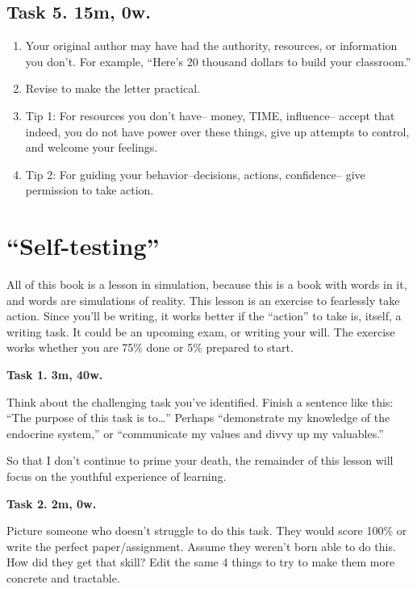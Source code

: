 \documentclass[
]{book}
\providecommand{\tightlist}{%
  \setlength{\itemsep}{0pt}\setlength{\parskip}{0pt}}
\begin{document}
\hypertarget{task-5.-15m-0w.}{%
\section{Task 5. 15m, 0w.}\label{task-5.-15m-0w.}}

\begin{enumerate}
\def\labelenumi{\arabic{enumi}.}
\setcounter{enumi}{66}
\tightlist
\item
  Your original author may have had the authority,
  resources, or information you don't. For example, ``Here's 20 thousand
  dollars to build your classroom.''
\item
  Revise to make the letter practical.
\item
  Tip 1: For resources you don't have-- money, TIME, influence-- accept
  that indeed, you do not have power over these things, give up
  attempts to control, and welcome your feelings.
\item
  Tip 2: For guiding your behavior--decisions, actions, confidence-- give
  permission to take action.
\end{enumerate}

\hypertarget{self-testing}{%
\chapter{``Self-testing''}\label{self-testing}}

All of this book is a lesson in simulation,
because this is a book with words in it,
and words are simulations of reality.
This lesson is an exercise to fearlessly
take action. Since you'll be writing,
it works better if the ``action'' to take is,
itself, a writing task.
It could be an upcoming exam, or writing your will.
The exercise works whether you are
75\% done or 5\% prepared to start.

\textbf{Task 1. 3m, 40w.}

Think about the challenging task you've identified.
Finish a sentence like this:
``The purpose of this task is to\ldots{}''
Perhaps ``demonstrate my knowledge of the endocrine system,'' or
``communicate my values and divvy up my valuables.''

So that I don't continue to prime your death, the remainder of this lesson will focus on the youthful experience of learning.

\textbf{Task 2. 2m, 0w.}

Picture someone who doesn't struggle to do this task.
They would score 100\% or write the perfect paper/assignment.
Assume they weren't born able to do this.
How did they get that skill?
Edit the same 4 things to try to make them more concrete and tractable.
\end{document}

